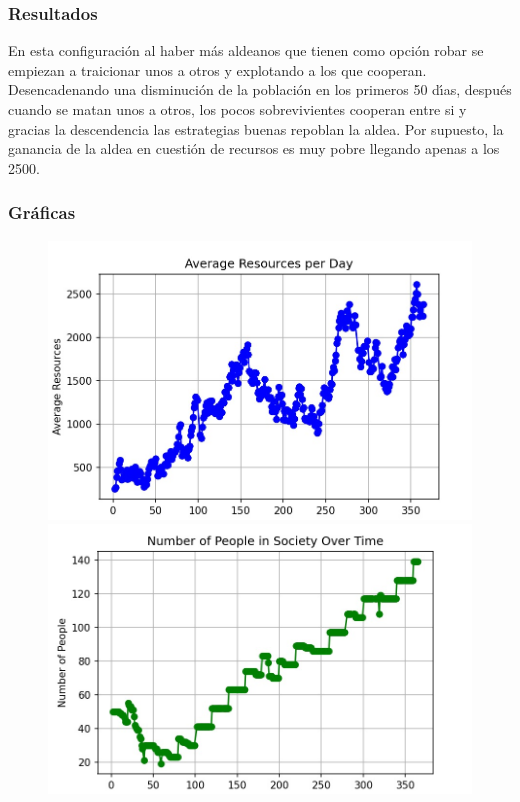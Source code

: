 \documentclass{article}
\begin{document}
\subsubsection{Resultados}
En esta configuraci\'on al haber m\'as aldeanos que tienen como opci\'on robar se empiezan a traicionar unos a otros y explotando a los que cooperan. Desencadenando una disminuci\'on de la
poblaci\'on en los primeros 50 d\'{\i}as, despu\'es cuando se matan unos a otros, los pocos sobrevivientes cooperan entre si y gracias la descendencia las estrategias buenas repoblan la aldea.
Por supuesto, la ganancia de la aldea en cuesti\'on de recursos es muy pobre llegando apenas a los 2500.

\subsubsection{Gr\'aficas}
\begin{figure}[h]
      \centering
      \begin{minipage}{0.42\textwidth}
            \centering
            \includegraphics[width=\textwidth]{resources_2.jpg}
      \end{minipage}\hfill
      \begin{minipage}{0.42\textwidth}
            \centering
            \includegraphics[width=\textwidth]{alive_1.jpg}
      \end{minipage}\hfill
\end{figure}
\end{document}

